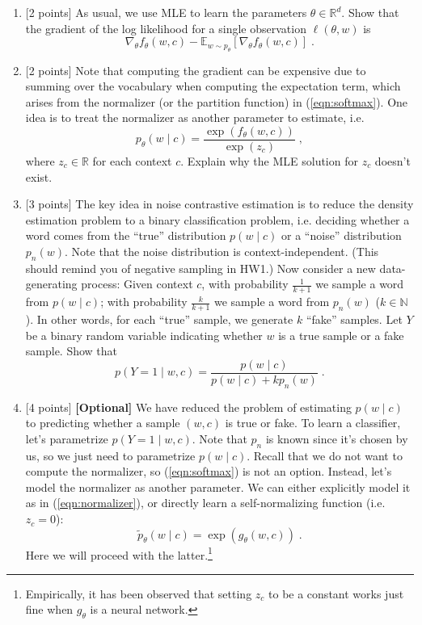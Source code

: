 \documentclass{article}
\theoremstyle{case}
\theoremstyle{definition}
\newcommand{\hint}[1]{\noindent{[\textbf{HINT:} #1]}}
\begin{document}
\begin{enumerate}
    \item {[2 points]} 
        As usual, we use MLE to learn the parameters $\theta\in\mathbb{R}^d$.
        Show that the gradient of the log likelihood for a single observation $\ell(\theta,w)$ is
        $$
        \nabla_\theta f_\theta(w, c)
        - \mathbb{E}_{w\sim p_\theta} [\nabla_\theta f_\theta(w, c)]
        \;.
        $$
    \newpage
    \item {[2 points]}
    Note that computing the gradient can be expensive due to summing over the vocabulary when computing the expectation term,
    which arises from the normalizer (or the partition function) in (\ref{eqn:softmax}).
    One idea is to treat the normalizer as another parameter to estimate, i.e.
        $$
        p_\theta(w\mid c) = \frac{\exp(f_\theta(w, c))}
        {\exp(z_c)} \;,
        \label{eqn:normalizer}
        $$
        where $z_c\in\mathbb{R}$ for each context $c$.
        Explain why the MLE solution for $z_c$ doesn't exist. 


    \newpage
    \item {[3 points]}
    The key idea in noise contrastive estimation is to reduce the density estimation problem to a binary classification problem, i.e.
        deciding whether a word comes from the ``true'' distribution $p(w\mid c)$ or a ``noise'' distribution $p_n(w)$.
        Note that the noise distribution is context-independent.
        (This should remind you of negative sampling in HW1.)
        Now consider a new data-generating process:
        Given context $c$, with probability $\frac{1}{k+1}$ we sample a word from $p(w\mid c)$;
        with probability $\frac{k}{k+1}$ we sample a word from $p_n(w)$ ($k\in \mathbb{N}$).
        In other words, for each ``true'' sample, we generate $k$ ``fake'' samples.
        Let $Y$ be a binary random variable indicating whether $w$ is a true sample or a fake sample.
        Show that 
        $$
        p(Y=1\mid w, c) = \frac{p(w\mid c)}{p(w\mid c) + kp_n(w)} \;.
        $$
        \hint{Use Bayes' rule.}

    \newpage
    \item{[4 points]} \textbf{[Optional]}
        We have reduced the problem of estimating $p(w\mid c)$ to predicting whether a sample $(w, c)$ is true or fake.
        To learn a classifier, let's parametrize $p(Y=1\mid w, c)$.
        Note that $p_n$ is known since it's chosen by us, so we just need to parametrize $p(w\mid c)$.
        Recall that we do not want to compute the normalizer, so (\ref{eqn:softmax}) is not an option.
        Instead, let's model the normalizer as another parameter. 
        We can either explicitly model it as in (\ref{eqn:normalizer}),
        or directly learn a self-normalizing function (i.e. $z_c=0$):
        $$
        \tilde{p}_\theta(w\mid c) = \exp (g_\theta(w, c)) \;.
        $$
        Here we will proceed with the latter.\footnote{Empirically, it has been observed that setting $z_c$ to be a constant works just fine when $g_\theta$ is a neural network.}
        

\end{enumerate}
\end{document}
